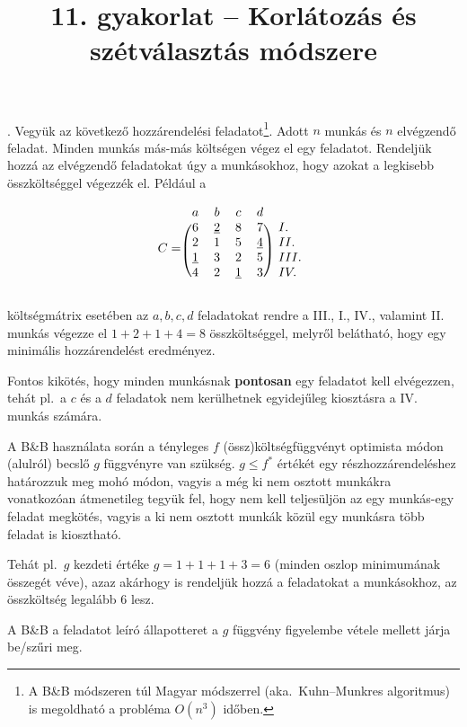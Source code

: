 \documentclass[12pt]{article}
\title{11. gyakorlat -- Korlátozás és szétválasztás módszere}
\date{}
\begin{document}
\maketitle

. Vegyük az következő hozzárendelési feladatot\footnote{A B\&B módszeren túl Magyar módszerrel (aka.~Kuhn–Munkres algoritmus) is megoldható a probléma $O(n^3)$ időben.}. Adott $n$ munkás és $n$ elvégzendő feladat. Minden munkás más-más költségen végez el egy feladatot. Rendeljük hozzá az elvégzendő feladatokat úgy a munkásokhoz, hogy azokat a legkisebb összköltséggel végezzék el. Például a

\[
C = \begin{blockarray}{ccccc}
a & b & c & d \\
\begin{block}{(cccc)l}
  6 & \underline{2} & 8 & 7 & I. \\
  2 & 1 & 5 & \underline{4} & II.\\
  \underline{1} & 3 & 2 & 5 & III. \\
  4 & 2 & \underline{1} & 3 & IV. \\
\end{block}
\end{blockarray}
 \]

\noindent költségmátrix esetében az $a,b,c,d$ feladatokat rendre a III., I., IV., valamint II. munkás végezze el $1+2+1+4=8$ összköltséggel, melyről belátható, hogy egy minimális hozzárendelést eredményez.

Fontos kikötés, hogy minden munkásnak \textbf{pontosan} egy feladatot kell elvégezzen, tehát pl.~a $c$ és a $d$ feladatok nem kerülhetnek egyidejűleg kiosztásra a IV. munkás számára.

A B\&B használata során a tényleges $f$ (össz)költségfüggvényt optimista módon 
(alulról) becslő $g$ függvényre van szükség. $g\le f^*$ értékét egy 
részhozzárendeléshez határozzuk meg mohó módon, vagyis a még ki nem osztott 
munkákra vonatkozóan átmenetileg tegyük fel, hogy nem kell teljesüljön az egy 
munkás-egy feladat megkötés, vagyis a ki nem osztott munkák közül egy munkásra 
több feladat is kiosztható.

Tehát pl.~$g$ kezdeti értéke $g=1+1+1+3=6$ (minden oszlop minimumának összegét 
véve), azaz akárhogy is rendeljük hozzá a feladatokat a munkásokhoz, az 
összköltség legalább $6$ lesz.

A B\&B a feladatot leíró állapotteret a $g$ függvény figyelembe vétele mellett 
járja be/szűri meg.
\end{document}
